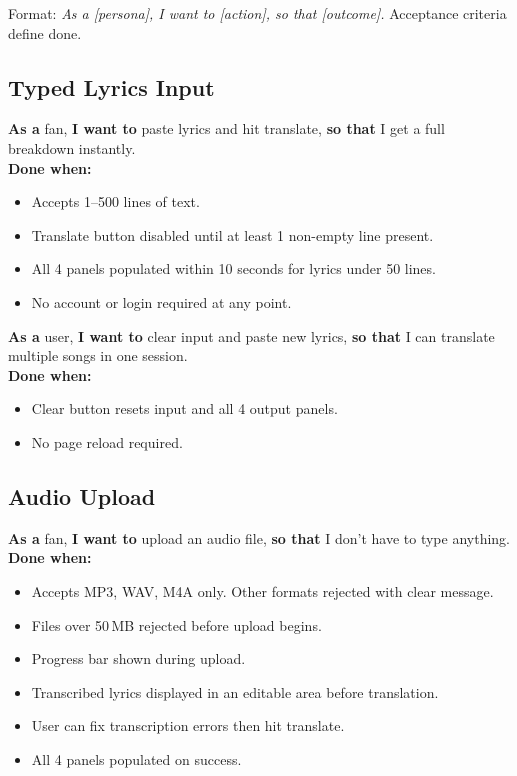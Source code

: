 \documentclass[12pt, a4paper]{article}
\begin{document}
Format: \textit{As a [persona], I want to [action], so that [outcome].}
Acceptance criteria define done.

\subsection{Typed Lyrics Input}

\begin{tcolorbox}[storybox, title={US-01 — Paste and Translate}]
  \textbf{As a} fan, \textbf{I want to} paste lyrics and hit translate,
  \textbf{so that} I get a full breakdown instantly.\\[0.4em]
  \textbf{Done when:}
  \begin{itemize}
    \item Accepts 1--500 lines of text.
    \item Translate button disabled until at least 1 non-empty line present.
    \item All 4 panels populated within 10 seconds for lyrics under 50 lines.
    \item No account or login required at any point.
  \end{itemize}
\end{tcolorbox}

\begin{tcolorbox}[storybox, title={US-02 — Clear and Re-translate}]
  \textbf{As a} user, \textbf{I want to} clear input and paste new lyrics,
  \textbf{so that} I can translate multiple songs in one session.\\[0.4em]
  \textbf{Done when:}
  \begin{itemize}
    \item Clear button resets input and all 4 output panels.
    \item No page reload required.
  \end{itemize}
\end{tcolorbox}

\subsection{Audio Upload}

\begin{tcolorbox}[storybox, title={US-03 — Upload Audio File}]
  \textbf{As a} fan, \textbf{I want to} upload an audio file,
  \textbf{so that} I don't have to type anything.\\[0.4em]
  \textbf{Done when:}
  \begin{itemize}
    \item Accepts MP3, WAV, M4A only. Other formats rejected with clear message.
    \item Files over 50\,MB rejected before upload begins.
    \item Progress bar shown during upload.
    \item Transcribed lyrics displayed in an editable area before translation.
    \item User can fix transcription errors then hit translate.
    \item All 4 panels populated on success.
  \end{itemize}
\end{tcolorbox}
\end{document}
